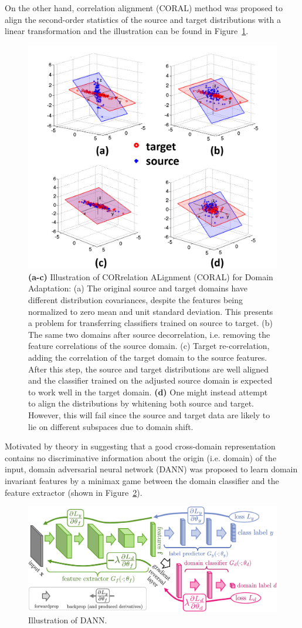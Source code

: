 \documentclass{article} %
\begin{document}
On the other hand, correlation alignment (CORAL) method \cite{sun2016return} was proposed to align the second-order statistics of the source and target distributions with a linear transformation and the illustration can be found in Figure~\ref{fig:coral}.
\begin{figure}[H]
	\centering
	\includegraphics[width=0.7\linewidth]{figs/coral}
	\caption{\small \textbf{(a-c)} Illustration of CORrelation ALignment (CORAL) for Domain Adaptation: (a) The original source and target domains have different distribution covariances, despite the features being normalized to zero mean and unit standard deviation. This presents a problem for transferring classifiers trained on source to target. (b) The same two domains after source decorrelation, i.e. removing the feature correlations of the source domain. (c) Target re-correlation, adding the correlation of the target domain to the source features. After this step, the source and target distributions are well aligned and the classifier trained on the adjusted source domain is expected to work well in the target domain. \textbf{(d)} One might instead attempt to align the distributions by whitening both source and target. However, this will fail since the source and target data are likely to lie on different subspaces due to domain shift.}
	\label{fig:coral}
\end{figure}

Motivated by theory in \cite{ben2007analysis,ben2010theory} suggesting that a good cross-domain representation contains no discriminative information about the origin (i.e. domain) of the input, domain adversarial neural network (DANN) \cite{ajakan2014domain,ganin2016domain} was proposed to learn domain invariant features by a minimax game between the domain classifier and the feature extractor (shown in Figure~\ref{fig:DANN}). 
\begin{figure}[H]
\centering
\includegraphics[width=0.7\linewidth]{figs/DANN}
\caption{Illustration of DANN.}
\label{fig:DANN}
\end{figure}
\end{document}
